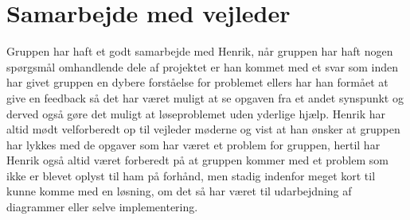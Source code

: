 \section{Samarbejde med vejleder}
Gruppen har haft et godt samarbejde med Henrik, når gruppen har haft nogen spørgsmål omhandlende dele af projektet er han kommet med et svar som inden har givet gruppen en dybere forståelse for problemet ellers har han formået at give en feedback så det har været muligt at se opgaven fra et andet synspunkt og derved også gøre det muligt at løseproblemet uden yderlige hjælp. Henrik har altid mødt velforberedt op til vejleder møderne og vist at han ønsker at gruppen har lykkes med de opgaver som har været et problem for gruppen, hertil har Henrik også altid været forberedt på at gruppen kommer med et problem som ikke er blevet oplyst til ham på forhånd, men stadig indenfor meget kort til kunne komme med en løsning, om det så har været til udarbejdning af diagrammer eller selve implementering.





\newpage